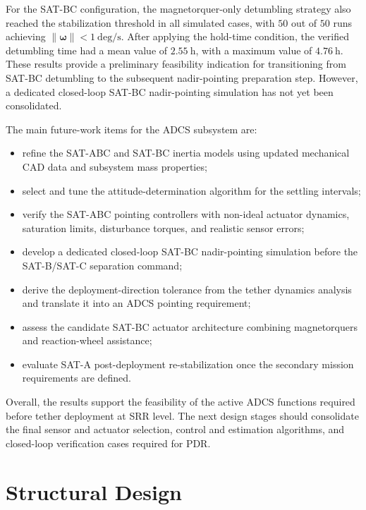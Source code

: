 For the SAT-BC configuration, the magnetorquer-only detumbling strategy also reached the stabilization threshold in all simulated cases, with \(50\) out of \(50\) runs achieving \(\|\boldsymbol{\omega}\| < 1~\mathrm{deg/s}\). After applying the hold-time condition, the verified detumbling time had a mean value of \(2.55~\mathrm{h}\), with a maximum value of \(4.76~\mathrm{h}\). These results provide a preliminary feasibility indication for transitioning from SAT-BC detumbling to the subsequent nadir-pointing preparation step. However, a dedicated closed-loop SAT-BC nadir-pointing simulation has not yet been consolidated.

The main future-work items for the ADCS subsystem are:

\begin{itemize}
    \item refine the SAT-ABC and SAT-BC inertia models using updated mechanical CAD data and subsystem mass properties;
    \item select and tune the attitude-determination algorithm for the settling intervals;
    \item verify the SAT-ABC pointing controllers with non-ideal actuator dynamics, saturation limits, disturbance torques, and realistic sensor errors;
    \item develop a dedicated closed-loop SAT-BC nadir-pointing simulation before the SAT-B/SAT-C separation command;
    \item derive the deployment-direction tolerance from the tether dynamics analysis and translate it into an ADCS pointing requirement;
    \item assess the candidate SAT-BC actuator architecture combining magnetorquers and reaction-wheel assistance;
    \item evaluate SAT-A post-deployment re-stabilization once the secondary mission requirements are defined.
\end{itemize}

Overall, the results support the feasibility of the active ADCS functions required before tether deployment at SRR level. The next design stages should consolidate the final sensor and actuator selection, control and estimation algorithms, and closed-loop verification cases required for PDR.

\section{Structural Design}
\label{sec:structural_design}


